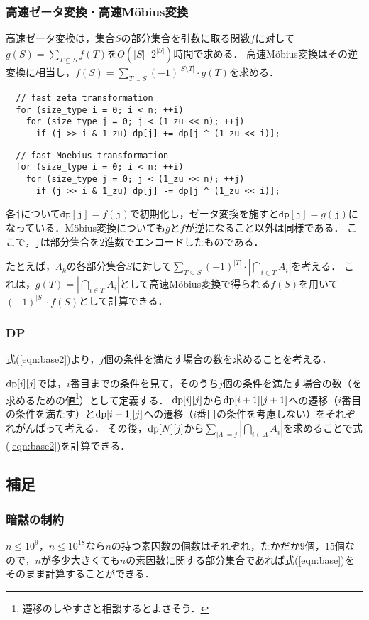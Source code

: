 \documentclass{jsarticle}
\newcommand{\DP}{\ensuremath\mathrm{dp}}
\begin{document}
\subsubsection{高速ゼータ変換・高速M\"obius変換}
高速ゼータ変換は，集合$S$の部分集合を引数に取る関数$f$に対して$g(S)=\sum_{T\subseteq S} f(T)$を$O(|S|\cdot 2^{|S|})$時間で求める．
高速M\"obius変換はその逆変換に相当し，$f(S)=\sum_{T\subseteq S} (-1)^{|S\setminus T|}\cdot g(T)$を求める．
\begin{verbatim}
  // fast zeta transformation
  for (size_type i = 0; i < n; ++i)
    for (size_type j = 0; j < (1_zu << n); ++j)
      if (j >> i & 1_zu) dp[j] += dp[j ^ (1_zu << i)];
\end{verbatim}
\begin{verbatim}
  // fast Moebius transformation
  for (size_type i = 0; i < n; ++i)
    for (size_type j = 0; j < (1_zu << n); ++j)
      if (j >> i & 1_zu) dp[j] -= dp[j ^ (1_zu << i)];
\end{verbatim}
各\texttt{j}について$\mathtt{dp}[\mathtt{j}] = f(\mathtt{j})$で初期化し，ゼータ変換を施すと$\mathtt{dp}[\mathtt{j}] = g(\mathtt{j})$になっている．M\"obius変換についても$g$と$f$が逆になること以外は同様である．
ここで，\texttt{j}は部分集合を2進数でエンコードしたものである．

たとえば，$\Lambda_k$の各部分集合$S$に対して$\sum_{T\subseteq S} (-1)^{|T|}\cdot \left|\bigcap_{i\in T}A_i\right|$を考える．
これは，$g(T) = \left|\bigcap_{i\in T} A_i\right|$として高速M\"obius変換で得られる$f(S)$を用いて$(-1)^{|S|}\cdot f(S)$として計算できる．

\subsubsection{DP}
式(\ref{eqn:base2})より，$j$個の条件を満たす場合の数を求めることを考える．

$\DP[i][j]$では，$i$番目までの条件を見て，そのうち$j$個の条件を満たす場合の数（を求めるための値\footnote{遷移のしやすさと相談するとよさそう．}）として定義する．
$\DP[i][j]$から$\DP[i+1][j+1]$への遷移（$i$番目の条件を満たす）と$\DP[i+1][j]$への遷移（$i$番目の条件を考慮しない）をそれぞれがんばって考える．
その後，$\DP[N][j]$から$\sum_{|\Lambda|=j}\left|\bigcap_{i\in\Lambda} A_i\right|$を求めることで式(\ref{eqn:base2})を計算できる．

\subsection{補足}
\subsubsection{暗黙の制約}
$n\le 10^9$，$n\le 10^{18}$なら$n$の持つ素因数の個数はそれぞれ，たかだか$9$個，$15$個なので，$n$が多少大きくても$n$の素因数に関する部分集合であれば式(\ref{eqn:base})をそのまま計算することができる．
\end{document}
